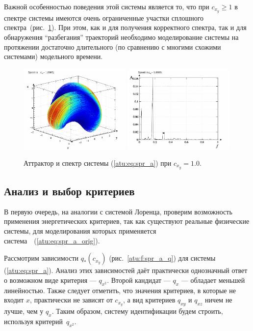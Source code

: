 Важной особенностью поведения этой системы является то, что при $ c_{x_y} \ge 1 $
в спектре системы имеются очень ограниченные участки сплошного спектра~(рис.~\ref{atu:f:spr_a_p_1000}).
При этом, как и для получения корректного спектра, так и для обнаружения ``разбегания'' траекторий
необходимо моделирование системы на протяжении достаточно длительного
(по сравнению с многими схожими системами) модельного времени.

\begin{figure}[htb!]
\centerline{
  \includegraphics[width=0.49\textwidth]{p/cha/spr_a/sprott_a-p_xyz_cx_y=1x000.png}
  \includegraphics[width=0.49\textwidth]{p/cha/spr_a/sprott_a_f-p_f_cx_y=1x000.png}
}
\caption{Аттрактор и спектр системы (\ref{atu:eq:spr_a}) при $ c_{x_y} =1.0 $.
}
\label{atu:f:spr_a_p_1000}
\end{figure}



\subsection{Анализ и выбор критериев}  %

В первую очередь, на аналогии с системой Лоренца,
проверим возможность применения энергетических критериев,
так как существуют реальные физические системы,
для моделирования которых применяется система~~(\ref{atu:eq:spr_a_orig}).

Рассмотрим зависимости $q_{*}(c_{x_y}) $ (рис.~\ref{atu:f:spr_a_q})
для системы (\ref{atu:eq:spr_a}). Анализ этих зависимостей
даёт практически однозначный ответ о возможном виде критерия --- $q_{x^2}$.
Второй кандидат --- $q_{x}$ --- обладает меньшей линейностью.
Также следует отметить, что
значения критериев, в которые не входит $x$, практически не зависят от $c_{x_y}$,
а вид критериев $q_{xy}$ и $q_{xz}$ ничем не лучше, чем у $q_{x}$.
Таким образом, систему идентификации будем строить, используя критерий~$q_{x^2}$.

